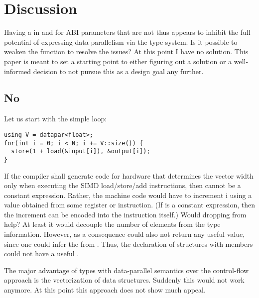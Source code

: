 \section{Discussion}

Having a   in \datapar and \mask for ABI parameters that are not  thus appears to inhibit the full potential of expressing data parallelism via the type system.
Is it possible to weaken the  function to resolve the issues?
At this point I have no solution.
This paper is meant to set a starting point to either figuring out a solution or a well-informed decision to not pursue this as a design goal any further.

\subsection{No }
Let us start with the simple loop:
\smallskip \begin{lstlisting}[style=Vc]
using V = datapar<float>;
for(int i = 0; i < N; i += V::size()) {
  store(1 + load(&input[i]), &output[i]);
}
\end{lstlisting}
If the compiler shall generate code for hardware that determines the vector width only when executing the SIMD load/store/add instructions, then  cannot be a constant expression.
Rather, the machine code would have to increment \code i using a value obtained from some register or instruction.
(If  is a constant expression, then the increment can be encoded into the instruction itself.)
Would dropping  from  help?
At least it would decouple the number of elements from the type information.
However, as a consequence  could also not return any useful value, since one could infer the  from .
Thus, the declaration of structures with \datapar members could not have a useful .

The major advantage of types with data-parallel semantics over the control-flow approach is the vectorization of data structures.
Suddenly this would not work anymore.
At this point this approach does not show much appeal.

